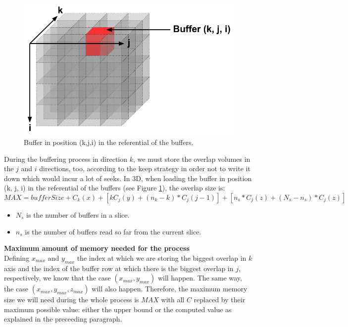 \documentclass[conference]{IEEEtran}
\begin{document}
\begin{figure}[h!]
\centering
\includegraphics[scale=0.3]{./figures/bufferkji.png}
\caption{Buffer in position (k,j,i) in the referential of the buffers.
\label{fig:bufferkji}
}
\end{figure}

During the buffering process in direction $k$, we must store the overlap volumes in the $j$ and $i$ directions, too, according to the keep strategy in order not to write it down which would incur a lot of seeks.
In 3D, when loading the buffer in position (k, j, i) in the referential of the buffers (see Figure \ref{fig:bufferkji}), the overlap size is:
$$ MAX =  bufferSize + C_k(x) + [kC_j(y) + (n_k-k)*C_j(j-1)] + [n_s*C_j(z) + (N_s - n_s)*C_j(z)] $$

\begin{itemize}
  \item $N_s$ is the number of buffers in a slice.
  \item $n_s$ is the number of buffers read so far from the current slice.
\end{itemize}

\noindent \textbf{Maximum amount of memory needed for the process} \\
Defining $x_{max}$ and $y_{max}$ the index at which we are storing the biggest overlap in $k$ axis and the index of the buffer row at which there is the biggest overlap in $j$, respectively, we know that the case $(x_{max}, y_{max})$ will happen.
The same way, the case $(x_{max}, y_{max}, z_{max})$ will also happen.
Therefore, the maximum memory size we will need during the whole process is $MAX$ with all $C$ replaced by their maximum possible value: either the upper bound or the computed value as explained in the preceeding paragraph.
\end{document}
